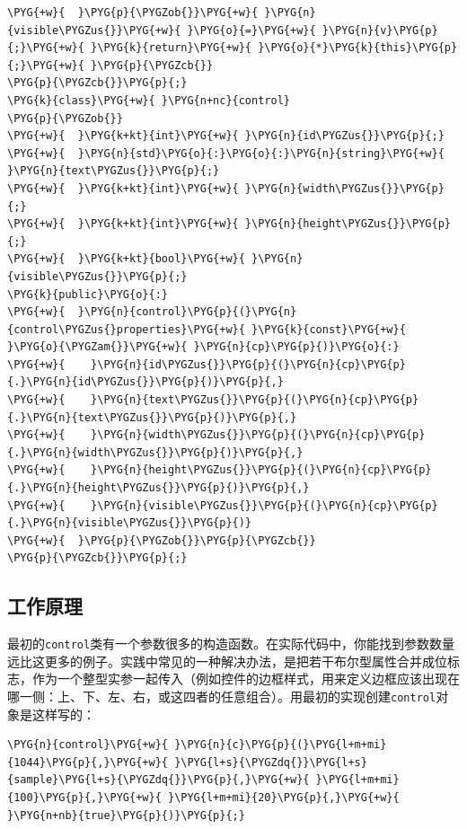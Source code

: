 \begin{codeblockbg}
\begin{Verbatim}[commandchars=\\\{\},breaklines=true,breakanywhere=true,fontsize=\codefont,xleftmargin=17bp]
\PYG{+w}{  }\PYG{p}{\PYGZob{}}\PYG{+w}{ }\PYG{n}{visible\PYGZus{}}\PYG{+w}{ }\PYG{o}{=}\PYG{+w}{ }\PYG{n}{v}\PYG{p}{;}\PYG{+w}{ }\PYG{k}{return}\PYG{+w}{ }\PYG{o}{*}\PYG{k}{this}\PYG{p}{;}\PYG{+w}{ }\PYG{p}{\PYGZcb{}}
\PYG{p}{\PYGZcb{}}\PYG{p}{;}
\PYG{k}{class}\PYG{+w}{ }\PYG{n+nc}{control}
\PYG{p}{\PYGZob{}}
\PYG{+w}{  }\PYG{k+kt}{int}\PYG{+w}{ }\PYG{n}{id\PYGZus{}}\PYG{p}{;}
\PYG{+w}{  }\PYG{n}{std}\PYG{o}{:}\PYG{o}{:}\PYG{n}{string}\PYG{+w}{ }\PYG{n}{text\PYGZus{}}\PYG{p}{;}
\PYG{+w}{  }\PYG{k+kt}{int}\PYG{+w}{ }\PYG{n}{width\PYGZus{}}\PYG{p}{;}
\PYG{+w}{  }\PYG{k+kt}{int}\PYG{+w}{ }\PYG{n}{height\PYGZus{}}\PYG{p}{;}
\PYG{+w}{  }\PYG{k+kt}{bool}\PYG{+w}{ }\PYG{n}{visible\PYGZus{}}\PYG{p}{;}
\PYG{k}{public}\PYG{o}{:}
\PYG{+w}{  }\PYG{n}{control}\PYG{p}{(}\PYG{n}{control\PYGZus{}properties}\PYG{+w}{ }\PYG{k}{const}\PYG{+w}{ }\PYG{o}{\PYGZam{}}\PYG{+w}{ }\PYG{n}{cp}\PYG{p}{)}\PYG{o}{:}
\PYG{+w}{    }\PYG{n}{id\PYGZus{}}\PYG{p}{(}\PYG{n}{cp}\PYG{p}{.}\PYG{n}{id\PYGZus{}}\PYG{p}{)}\PYG{p}{,}
\PYG{+w}{    }\PYG{n}{text\PYGZus{}}\PYG{p}{(}\PYG{n}{cp}\PYG{p}{.}\PYG{n}{text\PYGZus{}}\PYG{p}{)}\PYG{p}{,}
\PYG{+w}{    }\PYG{n}{width\PYGZus{}}\PYG{p}{(}\PYG{n}{cp}\PYG{p}{.}\PYG{n}{width\PYGZus{}}\PYG{p}{)}\PYG{p}{,}
\PYG{+w}{    }\PYG{n}{height\PYGZus{}}\PYG{p}{(}\PYG{n}{cp}\PYG{p}{.}\PYG{n}{height\PYGZus{}}\PYG{p}{)}\PYG{p}{,}
\PYG{+w}{    }\PYG{n}{visible\PYGZus{}}\PYG{p}{(}\PYG{n}{cp}\PYG{p}{.}\PYG{n}{visible\PYGZus{}}\PYG{p}{)}
\PYG{+w}{  }\PYG{p}{\PYGZob{}}\PYG{p}{\PYGZcb{}}
\PYG{p}{\PYGZcb{}}\PYG{p}{;}
\end{Verbatim}
\end{codeblockbg}



\subsection{工作原理}



最初的\texttt{control}类有一个参数很多的构造函数。在实际代码中，你能找到参数数量远比这更多的例子。实践中常见的一种解决办法，是把若干布尔型属性合并成位标志，作为一个整型实参一起传入（例如控件的边框样式，用来定义边框应该出现在哪一侧：上、下、左、右，或这四者的任意组合）。用最初的实现创建\texttt{control}对象是这样写的：



\begin{codeblockbg}
\begin{Verbatim}[commandchars=\\\{\},breaklines=true,breakanywhere=true,fontsize=\codefont,xleftmargin=17bp]
\PYG{n}{control}\PYG{+w}{ }\PYG{n}{c}\PYG{p}{(}\PYG{l+m+mi}{1044}\PYG{p}{,}\PYG{+w}{ }\PYG{l+s}{\PYGZdq{}}\PYG{l+s}{sample}\PYG{l+s}{\PYGZdq{}}\PYG{p}{,}\PYG{+w}{ }\PYG{l+m+mi}{100}\PYG{p}{,}\PYG{+w}{ }\PYG{l+m+mi}{20}\PYG{p}{,}\PYG{+w}{ }\PYG{n+nb}{true}\PYG{p}{)}\PYG{p}{;}
\end{Verbatim}
\end{codeblockbg}


